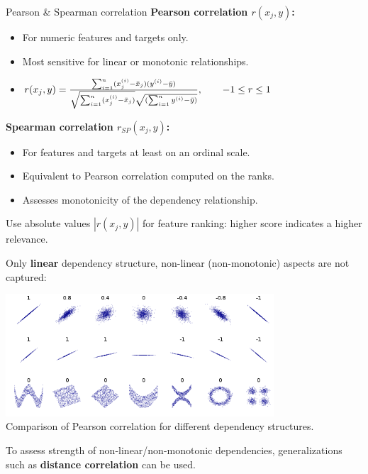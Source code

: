 \documentclass[11pt,compress,t,notes=noshow, xcolor=table]{beamer}
\begin{document}
  \begin{vbframe}{Pearson \& Spearman correlation}
  \textbf{Pearson correlation $r(x_j, y)$: }
  \begin{itemize}
    \item For numeric features and targets only.
    \item Most sensitive for linear or monotonic relationships.
    \item $ r(x_j, y) = \frac{\sum_{i=1}^n (x^{(i)}_j - \bar{x}_j) (y^{(i)} - \bar{y})}{\sqrt{\sum_{i=1}^n (x^{(i)}_j - \bar{x}_j)} \sqrt{(\sum_{i=1}^n y^{(i)} - \bar{y})}},\qquad -1 \le r \le 1$
  \end{itemize}
  \vspace{0.4cm}
  \textbf{Spearman correlation $r_{SP}(x_j, y)$:}
  \begin{itemize}
    \item For features and targets at least on an ordinal scale.
    \item Equivalent to Pearson correlation computed on the ranks.
    \item Assesses monotonicity of the dependency relationship.
  \end{itemize}
  \lz
  Use absolute values $|r(x_j, y)|$ for feature ranking: higher score indicates a higher relevance.

  \framebreak

  Only \textbf{linear} dependency structure, non-linear (non-monotonic) aspects are not captured:

  \lz

  \begin{center}
\includegraphics[width=0.75\textwidth]{figure_man/correlation_example.png}\\
\footnotesize{Comparison of Pearson correlation for different dependency structures.}
  \end{center}
  \vspace{0.1cm}
  To assess strength of non-linear/non-monotonic dependencies, generalizations such as \textbf{distance correlation} can be used.


\end{vbframe}
\end{document}
